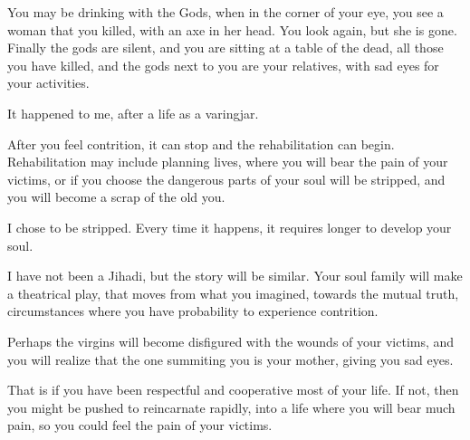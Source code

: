 You may be drinking with the Gods, when in the corner of your eye, you see a
woman that you killed, with an axe in her head. You look again, but she is gone.
Finally the gods are silent, and you are sitting at a table of the dead, all
those you have killed, and the gods next to you are your relatives, with sad 
eyes for your activities.

It happened to me, after a life as a varingjar. 

After you feel contrition, it can stop and the rehabilitation can begin.
Rehabilitation may include planning lives, where you will bear the pain of your
victims, or if you choose the dangerous parts of your soul will be stripped, and
you will become a scrap of the old you.\cite{newton2000destiny}

I chose to be stripped. Every time it happens, it requires longer to develop
your soul.

I have not been a Jihadi, but the story will be similar. Your soul family will
make a theatrical play, that moves from what you imagined, towards the mutual
truth, circumstances where you have probability to experience contrition.

Perhaps the virgins will become disfigured with the wounds of your victims, and
you will realize that the one summiting you is your mother, giving you sad eyes.

That is if you have been respectful and cooperative most of your life. 
If not, then you might be pushed to reincarnate rapidly, into a life where you
will bear much pain, so you could feel the pain of your
victims.\cite{newton1994journey}

